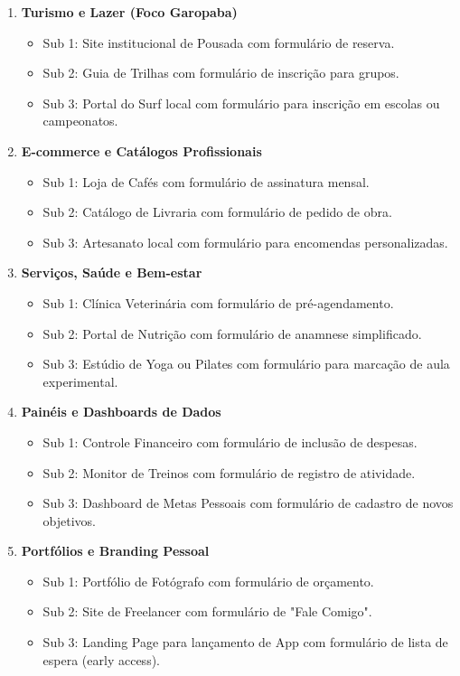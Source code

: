 \documentclass[12pt,a4paper]{article}
\begin{document}
\begin{enumerate}[label=\textbf{Tema \arabic*:}, leftmargin=2cm]
    \item \textbf{Turismo e Lazer (Foco Garopaba)}
    \begin{itemize}
        \item Sub 1: Site institucional de Pousada com formulário de reserva.
        \item Sub 2: Guia de Trilhas com formulário de inscrição para grupos.
        \item Sub 3: Portal do Surf local com formulário para inscrição em escolas ou campeonatos.
    \end{itemize}

    \item \textbf{E-commerce e Catálogos Profissionais}
    \begin{itemize}
        \item Sub 1: Loja de Cafés com formulário de assinatura mensal.
        \item Sub 2: Catálogo de Livraria com formulário de pedido de obra.
        \item Sub 3: Artesanato local com formulário para encomendas personalizadas.
    \end{itemize}

    \item \textbf{Serviços, Saúde e Bem-estar}
    \begin{itemize}
        \item Sub 1: Clínica Veterinária com formulário de pré-agendamento.
        \item Sub 2: Portal de Nutrição com formulário de anamnese simplificado.
        \item Sub 3: Estúdio de Yoga ou Pilates com formulário para marcação de aula experimental.
    \end{itemize}

    \item \textbf{Painéis e Dashboards de Dados}
    \begin{itemize}
        \item Sub 1: Controle Financeiro com formulário de inclusão de despesas.
        \item Sub 2: Monitor de Treinos com formulário de registro de atividade.
        \item Sub 3: Dashboard de Metas Pessoais com formulário de cadastro de novos objetivos.
    \end{itemize}

    \item \textbf{Portfólios e Branding Pessoal}
    \begin{itemize}
        \item Sub 1: Portfólio de Fotógrafo com formulário de orçamento.
        \item Sub 2: Site de Freelancer com formulário de "Fale Comigo".
        \item Sub 3: Landing Page para lançamento de App com formulário de lista de espera (early access).
    \end{itemize}


\end{enumerate}
\end{document}

